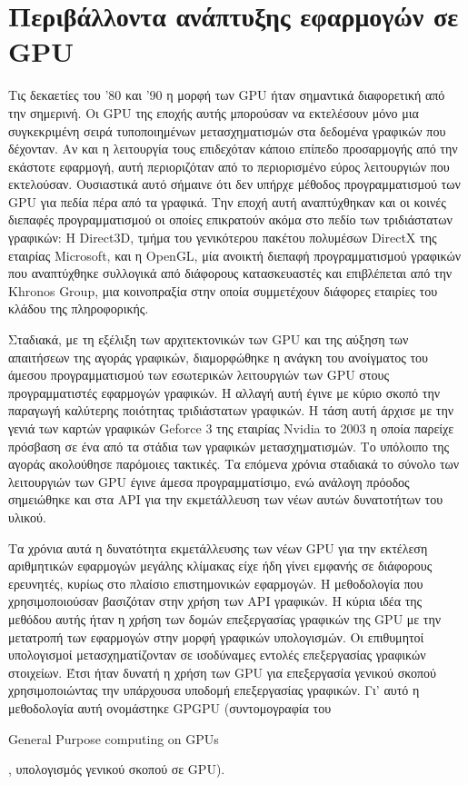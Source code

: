 \section{Περιβάλλοντα ανάπτυξης εφαρμογών σε GPU}
\label{chapter:apis}
\noindent Τις δεκαετίες του '80 και '90 η μορφή των GPU ήταν σημαντικά διαφορετική από την σημερινή. Οι GPU της εποχής αυτής μπορούσαν να εκτελέσουν μόνο μια συγκεκριμένη σειρά τυποποιημένων μετασχηματισμών στα δεδομένα γραφικών που δέχονταν. Αν και η λειτουργία τους επιδεχόταν κάποιο επίπεδο προσαρμογής από την εκάστοτε εφαρμογή, αυτή περιοριζόταν από το περιορισμένο εύρος λειτουργιών που εκτελούσαν. Ουσιαστικά αυτό σήμαινε ότι δεν υπήρχε μέθοδος προγραμματισμού των GPU για πεδία πέρα από τα γραφικά. Την εποχή αυτή αναπτύχθηκαν και οι κοινές διεπαφές προγραμματισμού οι οποίες επικρατούν ακόμα στο πεδίο των τριδιάστατων γραφικών: Η Direct3D, τμήμα του γενικότερου πακέτου πολυμέσων DirectX της εταιρίας Microsoft, και η OpenGL, μία ανοικτή διεπαφή προγραμματισμού γραφικών που αναπτύχθηκε συλλογικά από  διάφορους κατασκευαστές και επιβλέπεται από την Khronos Group, μια κοινοπραξία στην οποία συμμετέχουν διάφορες εταιρίες του κλάδου της πληροφορικής.

Σταδιακά, με τη εξέλιξη των αρχιτεκτονικών των GPU και της αύξηση των απαιτήσεων της αγοράς γραφικών, διαμορφώθηκε η ανάγκη του ανοίγματος του άμεσου προγραμματισμού των εσωτερικών λειτουργιών των GPU στους προγραμματιστές εφαρμογών γραφικών. Η αλλαγή αυτή έγινε με κύριο σκοπό την παραγωγή καλύτερης ποιότητας τριδιάστατων γραφικών. Η τάση αυτή άρχισε με την γενιά των καρτών γραφικών Geforce 3 της εταιρίας Nvidia το 2003 η οποία παρείχε πρόσβαση σε ένα από τα στάδια των γραφικών μετασχηματισμών. Το υπόλοιπο της αγοράς  ακολούθησε παρόμοιες τακτικές. Τα επόμενα χρόνια σταδιακά το σύνολο των λειτουργιών των GPU έγινε άμεσα προγραμματίσιμο, ενώ ανάλογη πρόοδος σημειώθηκε και στα API για την εκμετάλλευση των νέων αυτών δυνατοτήτων του υλικού.

Τα χρόνια αυτά η δυνατότητα εκμετάλλευσης των νέων GPU για την εκτέλεση  αριθμητικών εφαρμογών μεγάλης κλίμακας είχε ήδη γίνει εμφανής σε διάφορους ερευνητές, κυρίως στο πλαίσιο επιστημονικών εφαρμογών. Η μεθοδολογία που χρησιμοποιούσαν βασιζόταν στην χρήση των API γραφικών. Η κύρια ιδέα της μεθόδου αυτής ήταν η χρήση των δομών επεξεργασίας γραφικών της GPU με την μετατροπή των εφαρμογών στην μορφή γραφικών υπολογισμών. Οι επιθυμητοί υπολογισμοί μετασχηματίζονταν σε ισοδύναμες εντολές επεξεργασίας γραφικών στοιχείων. Έτσι ήταν δυνατή η χρήση των GPU για επεξεργασία γενικού σκοπού χρησιμοποιώντας την υπάρχουσα υποδομή επεξεργασίας γραφικών. Γι' αυτό η μεθοδολογία αυτή ονομάστηκε GPGPU (συντομογραφία του \begin{english}General Purpose computing on GPUs\end{english}, υπολογισμός γενικού σκοπού σε GPU).

